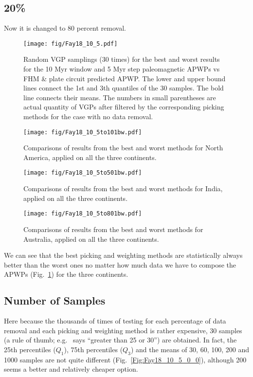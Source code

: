 \subsection{20\%}
Now it is changed to 80 percent removal.

\begin{figure}
    \centering
        \texttt{[image: fig/Fay18\_10\_5.pdf]}
    \captionsetup{width=.95\textwidth}
    \caption{Random VGP samplings (30 times) for the best and worst results for
	the 10 Myr window and 5 Myr step paleomagnetic APWPs vs FHM \& plate circuit
	predicted APWP\@. The lower and upper bound lines connect the 1st and 3th
	quantiles of the 30 samples. The bold line connects their means. The
	numbers in small parentheses are actual quantity of VGPs after filtered by
	the corresponding picking methods for the case with no data
	removal.}\label{Fig:Fay18_10_5bw}
\end{figure}

\begin{figure}
    \centering
        \texttt{[image: fig/Fay18\_10\_5to101bw.pdf]}
    \captionsetup{width=.95\textwidth}
    \caption{Comparisons of results from the best and worst methods for North
	America, applied on all the three continents.}\label{Fig:Fay18_10_5to101bw}
\end{figure}

\begin{figure}
    \centering
        \texttt{[image: fig/Fay18\_10\_5to501bw.pdf]}
    \captionsetup{width=.95\textwidth}
    \caption{Comparisons of results from the best and worst methods for India,
	applied on all the three continents.}\label{Fig:Fay18_10_5to501bw}
\end{figure}

\begin{figure}
    \centering
        \texttt{[image: fig/Fay18\_10\_5to801bw.pdf]}
    \captionsetup{width=.95\textwidth}
    \caption{Comparisons of results from the best and worst methods for
	Australia, applied on all the three continents.}\label{Fig:Fay18_10_5to801bw}
\end{figure}

We can see that the best picking and weighting methods are statistically always
better than the worst ones no matter how much data we have to compose the APWPs
(Fig.~\ref{Fig:Fay18_10_5bw}) for the three continents.

\subsection{Number of Samples}
Here because the thousands of times of testing for each percentage of data
removal and each picking and weighting method is rather expensive, 30 samples
(a rule of thumb; e.g.~\cite{H19} says ``greater than 25 or 30'') are obtained.
In fact, the 25th percentiles ($Q_1$), 75th percentiles ($Q_3$) and the means of
30, 60, 100, 200 and 1000 samples are not quite different
(Fig.~\ref{Fig:Fay18_10_5_0_0}), although 200 seems a better and relatively
cheaper option.

